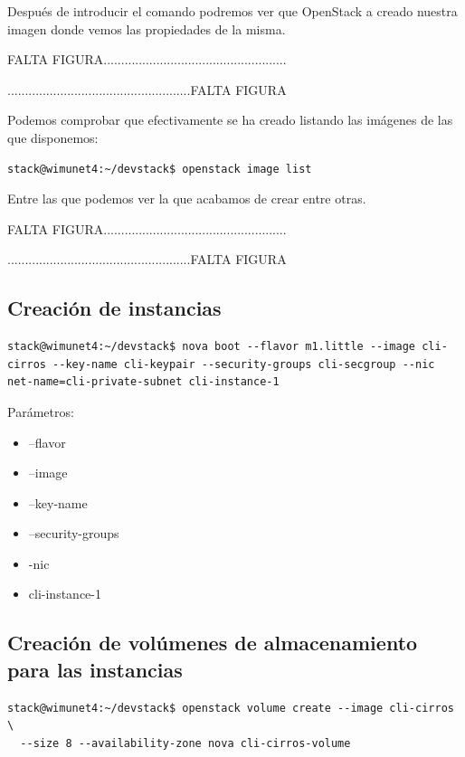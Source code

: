 Después de introducir el comando podremos ver que OpenStack a creado nuestra imagen donde vemos las propiedades de la misma.
\begin{tcolorbox}[colback=green!5!white,colframe=green!75!black]
FALTA FIGURA....................................................

....................................................FALTA FIGURA
\end{tcolorbox}

Podemos comprobar que efectivamente se ha creado listando las imágenes de las que disponemos:

\begin{lstlisting}[style=Consola]
stack@wimunet4:~/devstack$ openstack image list
\end{lstlisting}

Entre las que podemos ver la que acabamos de crear entre otras.

\begin{tcolorbox}[colback=green!5!white,colframe=green!75!black]
FALTA FIGURA....................................................

....................................................FALTA FIGURA
\end{tcolorbox}



\subsection{Creación de instancias}
\begin{lstlisting}[style=Consola]
stack@wimunet4:~/devstack$ nova boot --flavor m1.little --image cli-cirros --key-name cli-keypair --security-groups cli-secgroup --nic net-name=cli-private-subnet cli-instance-1
\end{lstlisting}

Parámetros:
\begin{itemize}
\item --flavor
\item --image
\item --key-name
\item --security-groups
\item -nic
\item cli-instance-1
\end{itemize}





\subsection{Creación de volúmenes de almacenamiento para las instancias}
\begin{lstlisting}[style=Consola]
stack@wimunet4:~/devstack$ openstack volume create --image cli-cirros \
  --size 8 --availability-zone nova cli-cirros-volume
\end{lstlisting}

